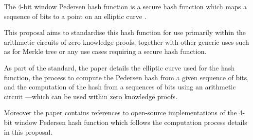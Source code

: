 The 4-bit window Pedersen hash function is a secure hash function
which maps a sequence of bits to a point on an elliptic curve \cite{pedersen-gen}.

This proposal aims to standardise this hash function
for use primarily within the arithmetic circuits of zero knowledge proofs,
together with other generic uses such as for Merkle tree or any use cases requiring a secure hash function.

As part of the standard, the paper details the elliptic curve used for the hash function,
the process to compute the Pedersen hash from a given sequence of bits,
and the computation of the hash from a sequences of bits using an arithmetic circuit
---which can be used within zero knowledge proofs.

Moreover the paper contains references to open-source implementations of the 4-bit window Pedersen hash function
which follows the computation process details in this proposal.
